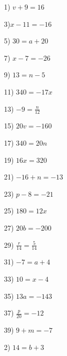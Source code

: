 \begin{multicols}{2}
  1) $v + 9 = 16$ \ \ \ \ \ \ \ \ \ \ \ \ \ \ \ \ \ \ \
  
  3)$x - 11 = - 16$ \ \ \ \ \ \ \ \ \ \ \ \ \ \ \ \ \ \ \ \ \ \ \ \ \ \ \ \
  
  5) $30 = a + 20$ \ \ \ \ \ \ \ \ \ \ \ \ \ \ \ \ \ \ \ \ \ \ \ \ \ \ \ \ \
  \ \
  
  7) $x - 7 = - 26$ \ \ \ \ \ \ \ \ \ \ \ \ \ \ \ \ \ \ \ \ \ \ \ \ \ \ \ \ \
  \
  
  9) $13 = n - 5$ \ \ \ \ \ \ \ \ \ \ \ \ \ \ \ \ \ \ \ \ \ \ \ \ \ \ \ \ \ \
  \ \ \
  
  11) $340 = - 17 x$ \ \ \ \ \ \ \ \ \ \ \ \ \ \ \ \ \ \ \ \ \ \ \ \ \ \ \ \
  \
  
  13) $- 9 = \frac{n}{12}$ \ \ \ \ \ \ \ \ \ \ \ \ \ \ \ \ \ \ \ \ \ \ \ \ \
  \ \ \ \ \ \ \ \ \
  
  15) $20 v = - 160$ \ \ \ \ \ \ \ \ \ \ \ \ \ \ \ \ \ \ \ \ \ \ \ \ \ \ \ \
  \
  
  17) $340 = 20 n$ \ \ \ \ \ \ \ \ \ \ \ \ \ \ \ \ \ \ \ \ \ \ \ \ \ \ \ \ \
  \ \ \
  
  19) $16 x = 320$ \ \ \ \ \ \ \ \ \ \ \ \ \ \ \ \ \ \ \ \ \ \ \ \ \ \ \ \ \
  \
  
  21) $- 16 + n = - 13$ \ \ \ \ \ \ \ \ \ \ \ \ \ \ \ \ \ \ \ \ \ \ \
  
  23) $p - 8 = - 21$ \ \ \ \ \ \ \ \ \ \ \ \ \ \ \ \ \ \ \ \ \ \ \ \ \ \ \
  
  25) $180 = 12 x$ \ \ \ \ \ \ \ \ \ \ \ \ \ \ \ \ \ \ \ \ \ \ \ \ \ \ \ \ \
  \ \
  
  27) $20 b = - 200$ \ \ \ \ \ \ \ \ \ \ \ \ \ \ \ \ \ \ \ \ \ \ \ \ \ \ \ \
  \
  
  29) $\frac{r}{14} = \frac{5}{14}$ \ \ \ \ \ \ \ \ \ \ \ \ \ \ \ \ \ \ \ \ \
  \ \ \ \ \ \ \ \ \ \ \ \ \
  
  31) $- 7 = a + 4$ \ \ \ \ \ \ \ \ \ \ \ \ \ \ \ \ \ \ \ \ \ \ \ \ \ \ \ \ \
  
  33) $10 = x - 4$ \ \ \ \ \ \ \ \ \ \ \ \ \ \ \ \ \ \ \ \ \ \ \ \ \ \ \ \ \
  \ \
  
  35) $13 a = - 143$ \ \ \ \ \ \ \ \ \ \ \ \ \ \ \ \ \ \ \ \ \ \ \ \ \ \ \ \
  \
  
  37) $\frac{p}{20} = - 12$ \ \ \ \ \ \ \ \ \ \ \ \ \ \ \ \ \ \ \ \ \ \ \ \ \
  \ \ \ \ \ \ \ \
  
  39) $9 + m = - 7$ \ \ \ \ \ \ \ \ \ \ \ \ \ \ \ \ \ \ \ \ \ \ \ \ \ \ \ \ \
  \ \ \ \ \ \ \ \
  
  2) $14 = b + 3$
  

\end{multicols}
